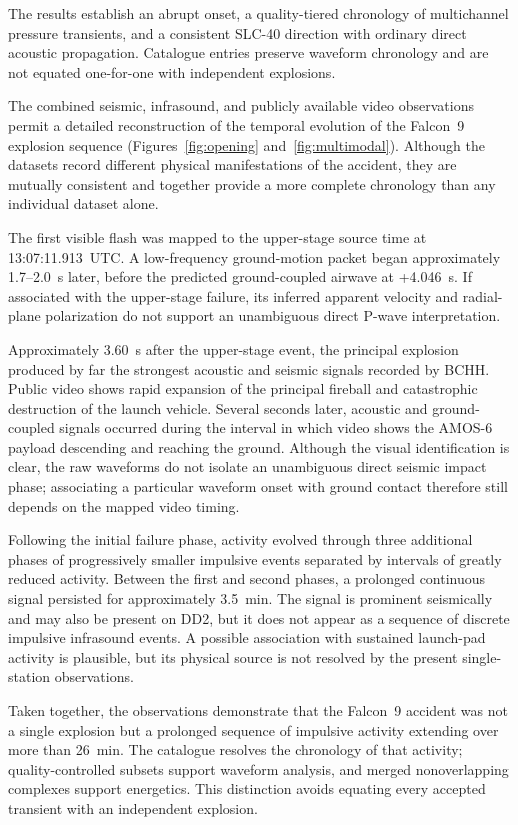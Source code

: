 \documentclass[]{seismica}
\begin{document}
The results establish an abrupt onset, a quality-tiered chronology of
multichannel pressure transients, and a consistent SLC-40 direction with
ordinary direct acoustic propagation. Catalogue entries preserve waveform
chronology and are not equated one-for-one with independent explosions.

The combined seismic, infrasound, and publicly available video observations
permit a detailed reconstruction of the temporal evolution of the Falcon~9
explosion sequence (Figures~\ref{fig:opening} and~\ref{fig:multimodal}). Although the datasets record
different physical manifestations of the accident, they are mutually
consistent and together provide a more complete chronology than any individual
dataset alone.

The first visible flash was mapped to the upper-stage source time at
13:07:11.913~UTC. A low-frequency ground-motion packet began approximately
1.7--2.0~s later, before the predicted ground-coupled airwave at +4.046~s. If
associated with the upper-stage failure, its inferred apparent velocity and
radial-plane polarization do not support an unambiguous direct P-wave
interpretation.

Approximately 3.60~s after the upper-stage event, the principal explosion
produced by far the strongest acoustic and seismic signals recorded by BCHH.
Public video shows rapid expansion of the principal fireball and catastrophic
destruction of the launch vehicle. Several seconds later, acoustic and ground-coupled signals occurred during
the interval in which video shows the AMOS-6 payload descending and reaching
the ground. Although the visual identification is clear, the raw waveforms do
not isolate an unambiguous direct seismic impact phase; associating a particular
waveform onset with ground contact therefore still depends on the mapped video
timing.

Following the initial failure phase, activity evolved through three
additional phases of progressively smaller impulsive events separated by
intervals of greatly reduced activity. Between the first and second phases, a
prolonged continuous signal persisted for approximately 3.5~min. The signal is
prominent seismically and may also be present on DD2, but it does not appear as
a sequence of discrete impulsive infrasound events. A possible association with
sustained launch-pad activity is plausible, but its physical source is not
resolved by the present single-station observations.

Taken together, the observations demonstrate that the Falcon~9 accident was
not a single explosion but a prolonged sequence of impulsive activity extending
over more than 26~min. The catalogue resolves the chronology of that activity;
quality-controlled subsets support waveform analysis, and merged nonoverlapping
complexes support energetics. This distinction avoids equating every accepted
transient with an independent explosion.
\end{document}
